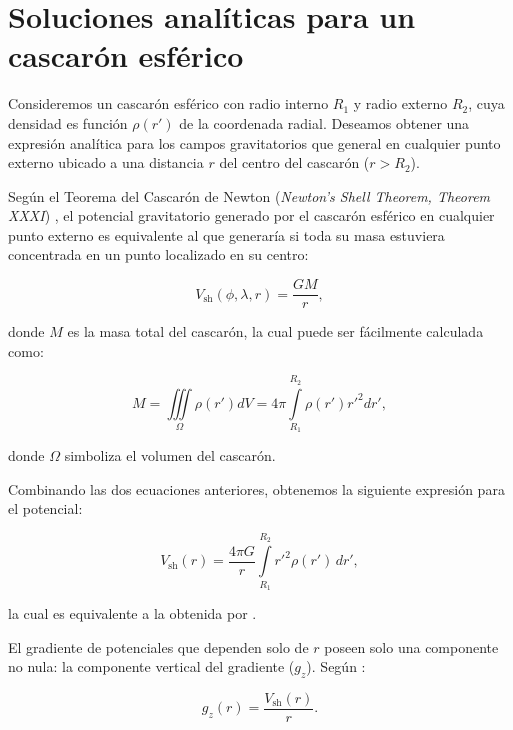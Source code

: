 \chapter{Soluciones analíticas para un cascarón esférico}
\label{cha:shell}

Consideremos un cascarón esférico con radio interno $R_1$ y radio externo
$R_2$, cuya densidad es función $\rho(r')$ de la coordenada radial.
Deseamos obtener una expresión analítica para los campos gravitatorios que
general en cualquier punto externo ubicado a una distancia $r$ del centro del
cascarón ($r > R_2$).

Según el Teorema del Cascarón de Newton (\emph{Newton's Shell Theorem, Theorem
XXXI}) \citep{chandrasekhar1995, binney2008}, el potencial gravitatorio
generado por el cascarón esférico en cualquier punto externo es equivalente
al que generaría si toda su masa estuviera concentrada en un punto localizado
en su centro:

\begin{equation}
    V_\text{sh}(\phi, \lambda, r) = \frac{GM}{r},
\end{equation}

\noindent donde $M$ es la masa total del cascarón, la cual puede ser fácilmente
calculada como:

\begin{equation}
    M =
    \iiint\limits_{\Omega} \rho(r') dV =
    4\pi \int\limits_{R_1}^{R_2} \rho(r') {r'}^2 dr',
\end{equation}

\noindent donde $\Omega$ simboliza el volumen del cascarón.

Combinando las dos ecuaciones anteriores, obtenemos la siguiente expresión para
el potencial:

\begin{equation}
    V_\text{sh}(r) = \frac{4\pi G}{r}
    \int\limits_{R_1}^{R_2} {r'}^2 \rho(r') \, dr',
\label{eq:shell-pot}
\end{equation}

\noindent la cual es equivalente a la obtenida por \citet[p.62]{binney2008}.

El gradiente de potenciales que dependen solo de $r$ poseen solo una componente
no nula: la componente vertical del gradiente ($g_z$).
Según \citet{grombein2013}:

\begin{equation}
    g_z(r) = \frac{V_\text{sh}(r)}{r}.
\label{eq:shell-gz}
\end{equation}

